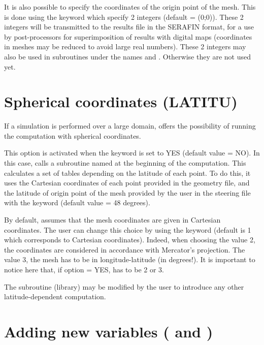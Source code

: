 It is also possible to specify the coordinates of the origin point of the mesh.
This is done using the keyword 
which specify 2 integers (default = (0;0)).
These 2 integers will be transmitted to the results file in the SERAFIN format,
for a use by post-processors for superimposition of results with digital maps
(coordinates in meshes may be reduced to avoid large real numbers).
These 2 integers may also be used in subroutines under the names
 and .
Otherwise they are not used yet.


\section{Spherical coordinates (LATITU)}
\label{sec:spher:coord:LATI}
If a simulation is performed over a large domain,  offers
the possibility of running the computation with spherical coordinates.

This option is activated when the keyword 
is set to YES (default value = NO).
In this case,  calls a subroutine named 
at the beginning of the computation.
This calculates a set of tables depending on the latitude of each point.
To do this, it uses the Cartesian coordinates of each point provided
in the geometry file, and the latitude of origin point of the mesh
provided by the user in the steering file with the keyword
 (default value = 48 degrees).

By default,  assumes that the mesh coordinates are given
in Cartesian coordinates.
The user can change this choice by using the keyword
 (default is 1 which corresponds to Cartesian
coordinates).
Indeed, when choosing the value 2, the coordinates are considered
in accordance with Mercator's projection.
The value 3, the mesh has to be in longitude-latitude (in degrees!).
It is important to notice here that, if option 
= YES,  has to be 2 or 3.

The  subroutine (\bief library) may be modified by the user
to introduce any other latitude-dependent computation.


\section{Adding new variables (
and )}

